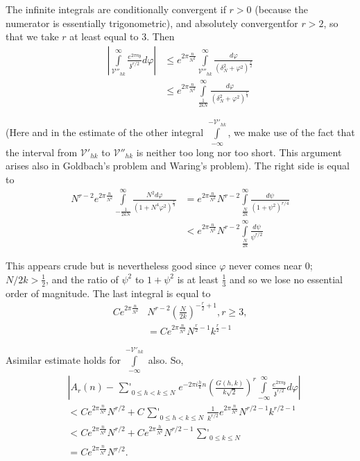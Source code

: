 The infinite integrals are conditionally convergent if $r > 0$
(because the numerator is essentially trigonometric), and absolutely
convergent\pageoriginale for $r>2$, so that we take $r$ at least equal to 3. Then
\begin{align*}
  \left| \int\limits^{\infty}_{\mathscr{V}''_{hk}} \frac{e^{2 \pi n
      \mathfrak{z}}}{\mathfrak{z}^{r/2}} d \varphi\right| & \leq
  e^{2\pi \frac{n}{N^2}} \int\limits^\infty_{\mathscr{V}''_{hk}}
  \frac{d \varphi}{(\delta^2_N + \varphi^2)^{\frac{r}{2}}}\\
  &  \leq e^{2 \pi \frac{n}{N^2}} \int\limits^\infty_{\frac{1}{2kN}}
  \frac{d \varphi}{(\delta^2_N + \varphi^2)^{\frac{r}{4}}}
\end{align*}

(Here and in the estimate of the other integral $\int\limits^{-
  \mathscr{V}'_{hk}}_{- \infty}$, we make use of the fact that the
interval from $\mathscr{V}'_{hk}$ to $\mathscr{V}''_{hk}$ is neither
too long nor too short. This argument arises also in Goldbach's problem
and Waring's problem). The right side is equal to 
\begin{align*}
  N^{r-2} e^{2 \pi \frac{n}{N^2}} \int\limits^\infty_{- \frac{1}{2kN}}
  \frac{N^2 d \varphi}{(1+ N^4 \varphi^2)^{\frac{r}{4}}} & = e^{2 \pi
    \frac{n}{N^2}} N^{r-2} \int\limits^\infty_{\frac{N}{2k}} \frac{d
    \psi}{(1+ \psi^2)^{r/4}}\\
  & < e^{2 \pi \frac{n}{N^2}} N^{r-2}
  \int\limits^\infty_{\frac{N}{2k}} \frac{d \psi}{\psi^{r/2}}
\end{align*}

This appears crude but is nevertheless good since $\varphi$ never
comes near $0$; $N/2k> \frac{1}{2}$, and the ratio of $\psi^2$ to
$1+ \psi^2$ is at least $\frac{1}{3}$ and so we lose no essential
order of magnitude. The last integral is equal to 
\begin{align*}
  Ce^{2\pi \frac{n}{N^2}} & N^{r-2} \left(\frac{N}{2k} \right)^{-
    \frac{r}{2}+1}, r \geq 3,\\ 
  & = C e^{2\pi \frac{n}{N^2}} N^{\frac{r}{2}-1} k^{\frac{r}{2}-1}
\end{align*}

A\pageoriginale similar estimate holds for $\int\limits^{-
  \mathscr{V}'_{hk}}_{- \infty}$ also. So, 
\begin{align*}
  & \left| A_r (n) - \mathop{\textstyle\sum'}_{0\leq h < k \leq N}
  e^{- 2 \pi i \frac{h}{k}
    n}\left( \frac{G(h, k)}{k \sqrt{2}}\right)^r
  \int\limits^\infty_{- \infty} \frac{e^{2 \pi n
      \mathfrak{z}}}{\mathfrak{z}^{r/2}} d \varphi\right|\\
  & < C e^{2 \pi \frac{n}{N^2}} N^{r/2} + C \mathop{\textstyle\sum'}_{0 \leq h< k \leq N}
  \frac{1}{k^{r/2}} e^{2 \pi \frac{n}{N^2}} N^{r/2-1} k^{r/2-1}\\
  & < C e^{2 \pi \frac{n}{N^2}} N^{r/2} + C e^{2 \pi \frac{h}{N^2}}
  N^{r/2-1} \mathop{\textstyle\sum'}_{0 \leq k \leq N}\\
  & = C e^{2 \pi \frac{n}{N^2}} N^{r/2}.
\end{align*}

